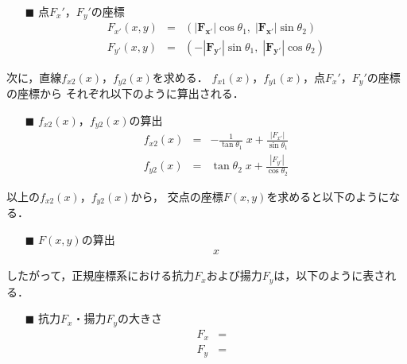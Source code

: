 \documentclass[twocolumn,a4j]{jsarticle}
\begin{document}
\begin{itemize}
    \item [$\blacksquare$] 点$F_x'$，$F_y'$の座標
    \begin{eqnarray*}
        F_{x'} \left(x ,y\right) &=& \left(|\boldsymbol{F_{x'}}| \cos \theta_1,\; |\boldsymbol{F_{x'}}| \sin \theta_2\right)\\
        F_{y'} \left(x ,y\right) &=& \left( - |\boldsymbol{F_{y'}}| \sin \theta_1,\; |\boldsymbol{F_{y'}}| \cos \theta_2\right)
    \end{eqnarray*}    
\end{itemize}

次に，直線$f_{x2}\left(x\right)$，$f_{y2}\left(x\right)$を求める．
$f_{x1}\left(x\right)$，$f_{y1}\left(x\right)$，点$F_x'$，$F_y'$の座標の座標から
それぞれ以下のように算出される．

\begin{itemize}
    \item [$\blacksquare$] $f_{x2}\left(x\right)$，$f_{y2}\left(x\right)$の算出
    \begin{eqnarray*}
        f_{x2}\left(x\right) &=& - \frac{1}{\tan \theta_1} \; x + \frac{|F_{x'}|}{\sin \theta_1}\\
        f_{y2}\left(x\right) &=& \tan \theta_2\; x + \frac{|F_{y'}|}{\cos \theta_2}
    \end{eqnarray*}    
\end{itemize}

以上の$f_{x2}\left(x\right)$，$f_{y2}\left(x\right)$から，
交点の座標$F\left(x,y\right)$を求めると以下のようになる．

\begin{itemize}
    \item [$\blacksquare$] $F\left(x,y\right)$の算出
    \begin{eqnarray*}
        x
    \end{eqnarray*}    
\end{itemize}

したがって，正規座標系における抗力$F_x$および揚力$F_y$は，以下のように表される．

\begin{itemize}
    \item [$\blacksquare$] 抗力$F_x$・揚力$F_y$の大きさ
    \begin{eqnarray*}
        F_x &=& \\ 
        F_y &=&  
    \end{eqnarray*}    
\end{itemize}
\end{document}
